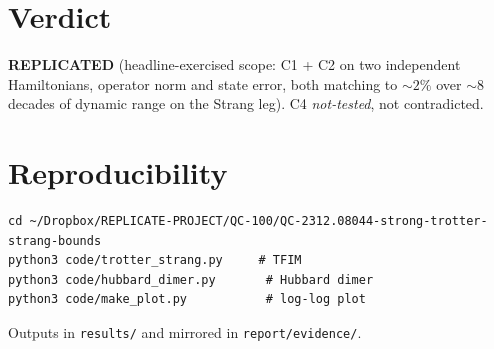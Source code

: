 \documentclass[11pt]{article}
\begin{document}
\section{Verdict}
\textbf{REPLICATED} (headline-exercised scope: C1 + C2 on two independent Hamiltonians,
operator norm and state error, both matching to $\sim 2\%$ over $\sim 8$ decades of dynamic
range on the Strang leg). C4 \emph{not-tested}, not contradicted.

\section{Reproducibility}
\begin{verbatim}
cd ~/Dropbox/REPLICATE-PROJECT/QC-100/QC-2312.08044-strong-trotter-strang-bounds
python3 code/trotter_strang.py     # TFIM
python3 code/hubbard_dimer.py       # Hubbard dimer
python3 code/make_plot.py           # log-log plot
\end{verbatim}
Outputs in \texttt{results/} and mirrored in \texttt{report/evidence/}.


\end{document}

